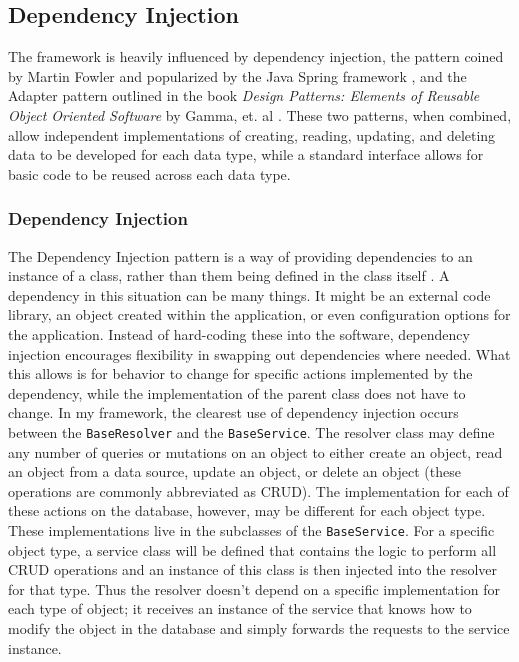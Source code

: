 \subsection{Dependency Injection}
The framework is heavily influenced by dependency injection, the pattern coined by Martin Fowler and popularized by the Java Spring framework \cite{fowlerInversionControlContainers2004}, and the Adapter pattern outlined in the book \textit{Design Patterns: Elements of Reusable Object Oriented Software} by Gamma, et. al \cite{gammaDesignPatternsElements1995}.  These two patterns, when combined, allow independent implementations of creating, reading, updating, and deleting data to be developed for each data type, while a standard interface allows for basic code to be reused across each data type.

\subsubsection{Dependency Injection}
The Dependency Injection pattern is a way of providing dependencies to an instance of a class, rather than them being defined in the class itself \cite{fowlerInversionControlContainers2004}. A dependency in this situation can be many things.  It might be an external code library, an object created within the application, or even configuration options for the application.  Instead of hard-coding these into the software, dependency injection encourages flexibility in swapping out dependencies where needed. What this allows is for behavior to change for specific actions implemented by the dependency, while the implementation of the parent class does not have to change.  In my framework, the clearest use of dependency injection occurs between the \verb!BaseResolver! and the \verb!BaseService!.  The resolver class may define any number of queries or mutations on an object to either create an object, read an object from a data source, update an object, or delete an object (these operations are commonly abbreviated as CRUD).  The implementation for each of these actions on the database, however, may be different for each object type.  These implementations live in the subclasses of the \verb!BaseService!.  For a specific object type, a service class will be defined that contains the logic to perform all CRUD operations and an instance of this class is then injected into the resolver for that type.  Thus the resolver doesn't depend on a specific implementation for each type of object; it receives an instance of the service that knows how to modify the object in the database and simply forwards the requests to the service instance.

